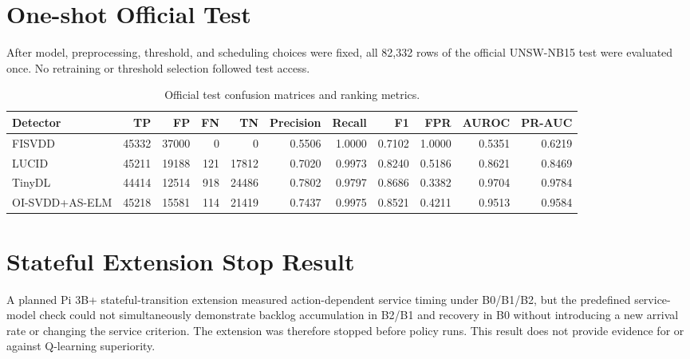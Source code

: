 \documentclass[10pt,journal]{IEEEtran}
\begin{document}
\section{One-shot Official Test}
After model, preprocessing, threshold, and scheduling choices were fixed, all 82,332 rows of the official UNSW-NB15 test were evaluated once. No retraining or threshold selection followed test access.

\begin{table}[h]
\caption{Official test confusion matrices and ranking metrics.}
\centering\footnotesize
\begin{tabular}{lrrrrrrrrrr}
\toprule
Detector & TP & FP & FN & TN & Precision & Recall & F1 & FPR & AUROC & PR-AUC \\
\midrule
FISVDD & 45332 & 37000 & 0 & 0 & 0.5506 & 1.0000 & 0.7102 & 1.0000 & 0.5351 & 0.6219 \\
LUCID & 45211 & 19188 & 121 & 17812 & 0.7020 & 0.9973 & 0.8240 & 0.5186 & 0.8621 & 0.8469 \\
TinyDL & 44414 & 12514 & 918 & 24486 & 0.7802 & 0.9797 & 0.8686 & 0.3382 & 0.9704 & 0.9784 \\
OI-SVDD+AS-ELM & 45218 & 15581 & 114 & 21419 & 0.7437 & 0.9975 & 0.8521 & 0.4211 & 0.9513 & 0.9584 \\
\bottomrule
\end{tabular}
\end{table}

\section{Stateful Extension Stop Result}
A planned Pi 3B+ stateful-transition extension measured action-dependent service timing under B0/B1/B2, but the predefined service-model check could not simultaneously demonstrate backlog accumulation in B2/B1 and recovery in B0 without introducing a new arrival rate or changing the service criterion. The extension was therefore stopped before policy runs. This result does not provide evidence for or against Q-learning superiority.
\end{document}
